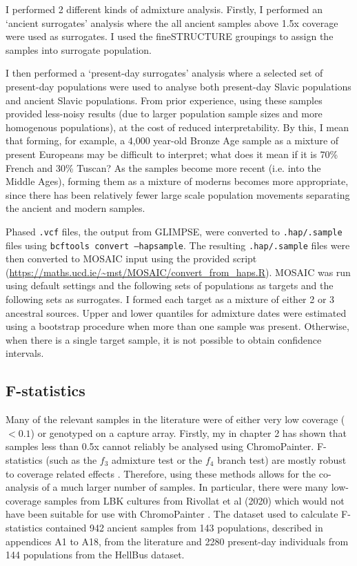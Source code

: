 I performed 2 different kinds of admixture analysis. Firstly, I performed an `ancient surrogates' analysis where the all ancient samples above 1.5x coverage were used as surrogates. I used the fineSTRUCTURE groupings to assign the samples into surrogate population.

I then performed a `present-day surrogates' analysis where a selected set of present-day populations were used to analyse both present-day Slavic populations and ancient Slavic populations. From prior experience, using these samples provided less-noisy results (due to larger population sample sizes and more homogenous populations), at the cost of reduced interpretability. By this, I mean that forming, for example, a 4,000 year-old Bronze Age sample as a mixture of present Europeans may be difficult to interpret; what does it mean if it is 70\% French and 30\% Tuscan? As the samples become more recent (i.e. into the Middle Ages), forming them as a mixture of moderns becomes more appropriate, since there has been relatively fewer large scale population movements separating the ancient and modern samples.

Phased \texttt{.vcf} files, the output from GLIMPSE, were converted to \texttt{.hap/.sample} files using \texttt{bcftools convert --hapsample}. The resulting \texttt{.hap/.sample} files were then converted to MOSAIC input using the provided script (\url{https://maths.ucd.ie/~mst/MOSAIC/convert_from_haps.R}). MOSAIC was run using default settings and the following sets of populations as targets and the following sets as surrogates. I formed each target as a mixture of either 2 or 3 ancestral sources. Upper and lower quantiles for admixture dates were estimated using a bootstrap procedure when more than one sample was present. Otherwise, when there is a single target sample, it is not possible to obtain confidence intervals.

\subsection{F-statistics}

Many of the relevant samples in the literature were of either very low coverage ($<0.1$) or genotyped on a capture array. Firstly, my in chapter 2 has shown that samples less than 0.5x cannot reliably be analysed using ChromoPainter. F-statistics (such as the $f_{3}$ admixture test or the $f_{4}$ branch test) are mostly robust to coverage related effects \cite{AssessingqpAdm}. Therefore, using these methods allows for the co-analysis of a much larger number of samples. In particular, there were many low-coverage samples from LBK cultures from Rivollat et al (2020) which would not have been suitable for use with ChromoPainter \cite{rivollat2020france}. The dataset used to calculate F-statistics contained 942 ancient samples from 143 populations, described in appendices A1 to A18, from the literature and 2280 present-day individuals from 144 populations from the HellBus dataset. 

